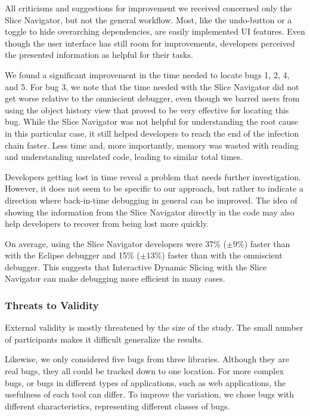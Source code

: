\documentclass[
			english,
			review,
			]{elsarticle}
\begin{document}
All criticisms and suggestions for improvement we received concerned only the Slice Navigator, but not the general workflow.
Most, like the undo-button or a toggle to hide overarching dependencies, are easily implemented UI features.
Even though the user interface has still room for improvements, developers perceived the presented information as helpful for their tasks.

We found a significant improvement in the time needed to locate bugs 1, 2, 4, and 5.
For bug 3, we note that the time needed with the Slice Navigator did not get worse relative to the omniscient debugger, even though we barred users from using the object history view that proved to be very effective for locating this bug.
While the Slice Navigator was not helpful for understanding the root cause in this particular case, it still helped developers to reach the end of the infection chain faster.
Less time and, more importantly, memory was wasted with reading and understanding unrelated code, leading to similar total times.

Developers getting lost in time reveal a problem that needs further investigation. 
However, it does not seem to be specific to our approach, but rather to indicate a direction where back-in-time debugging in general can be improved.
The idea of showing the information from the Slice Navigator directly in the code may also help developers to recover from being lost more quickly.

On average, using the Slice Navigator developers were 37\% ($\pm9\%$) faster than with the Eclipse debugger and 15\% ($\pm13\%$) faster than with the omniscient debugger.
This suggests that Interactive Dynamic Slicing with the Slice Navigator can make debugging more efficient in many cases.

\subsubsection{Threats to Validity}

External validity is mostly threatened by the size of the study. 
The small number of participants makes it difficult generalize the results.

Likewise, we only considered five bugs from three libraries.
Although they are real bugs, they all could be tracked down to one location.
For more complex bugs, or bugs in different types of applications, such as web applications, the usefulness of each tool can differ.
To improve the variation, we chose bugs with different characteristics, representing different classes of bugs.
\end{document}
